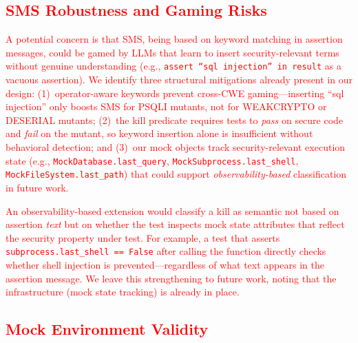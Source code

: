 \documentclass[sigconf,anonymous,review]{acmart}
\begin{document}
\textcolor{red}{
\subsection{SMS Robustness and Gaming Risks}



A potential concern is that SMS, being based on keyword matching in assertion messages, could be gamed by LLMs that learn to insert security-relevant terms without genuine understanding (e.g., \texttt{assert ``sql injection'' in result} as a vacuous assertion). We identify three structural mitigations already present in our design: (1)~operator-aware keywords prevent cross-CWE gaming---inserting ``sql injection'' only boosts SMS for \textsc{PSQLI} mutants, not for \textsc{WEAKCRYPTO} or \textsc{DESERIAL} mutants; (2)~the kill predicate requires tests to \emph{pass} on secure code and \emph{fail} on the mutant, so keyword insertion alone is insufficient without behavioral detection; and (3)~our mock objects track security-relevant execution state (e.g., \texttt{MockDatabase.last\_query}, \texttt{MockSubprocess.last\_shell}, \texttt{MockFileSystem.last\_path}) that could support \emph{observability-based} classification in future work.



An observability-based extension would classify a kill as semantic not based on assertion \emph{text} but on whether the test inspects mock state attributes that reflect the security property under test. For example, a test that asserts \texttt{subprocess.last\_shell == False} after calling the function directly checks whether shell injection is prevented---regardless of what text appears in the assertion message. We leave this strengthening to future work, noting that the infrastructure (mock state tracking) is already in place.



\subsection{Mock Environment Validity}



}
\end{document}
